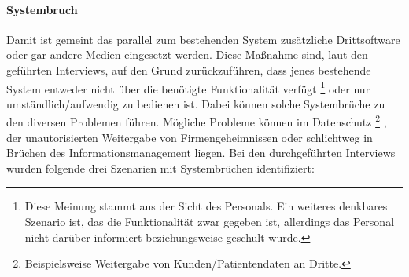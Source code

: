 \documentclass[Bachelorarbeit.tex]{subfiles}
\begin{document}

\paragraph{Systembruch}
\label{interviewsAnalyseSystembruch}
Damit ist gemeint das parallel zum bestehenden System zusätzliche Drittsoftware oder gar andere Medien eingesetzt werden.
Diese Maßnahme sind, laut den geführten Interviews, auf den Grund zurückzuführen, dass jenes bestehende System entweder nicht über die benötigte Funktionalität verfügt
\footnote{
	Diese Meinung stammt aus der Sicht des Personals. 
	Ein weiteres denkbares Szenario ist, das die Funktionalität zwar gegeben ist, allerdings das Personal nicht darüber informiert beziehungsweise geschult wurde.
	} 
oder nur umständlich/aufwendig zu bedienen ist.
Dabei können solche Systembrüche zu den diversen Problemen führen. 
Mögliche Probleme können im Datenschutz
\footnote{
	Beispielsweise Weitergabe von Kunden/Patientendaten an Dritte.
	}
	, der unautorisierten Weitergabe von Firmengeheimnissen oder schlichtweg in Brüchen des Informationsmanagement liegen.  
Bei den durchgeführten Interviews wurden folgende drei Szenarien mit Systembrüchen identifiziert:
\end{document}
